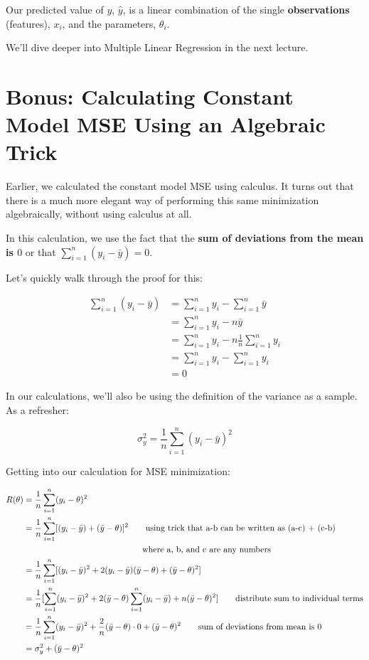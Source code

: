 \documentclass[
  letterpaper,
  DIV=11,
  numbers=noendperiod]{scrreprt}
\begin{document}
Our predicted value of \(y\), \(\hat{y}\), is a linear combination of
the single \textbf{observations} (features), \(x_i\), and the
parameters, \(\theta_i\).

We'll dive deeper into Multiple Linear Regression in the next lecture.

\section{Bonus: Calculating Constant Model MSE Using an Algebraic
Trick}\label{bonus-calculating-constant-model-mse-using-an-algebraic-trick}

Earlier, we calculated the constant model MSE using calculus. It turns
out that there is a much more elegant way of performing this same
minimization algebraically, without using calculus at all.

In this calculation, we use the fact that the \textbf{sum of deviations
from the mean is \(0\)} or that \(\sum_{i=1}^{n} (y_i - \bar{y}) = 0\).

Let's quickly walk through the proof for this:

\begin{align}
\sum_{i=1}^{n} (y_i - \bar{y}) &= \sum_{i=1}^{n} y_i - \sum_{i=1}^{n} \bar{y} \\
 &= \sum_{i=1}^{n} y_i - n\bar{y} \\
 &= \sum_{i=1}^{n} y_i - n\frac{1}{n}\sum_{i=1}^{n}y_i \\
 &= \sum_{i=1}^{n} y_i - \sum_{i=1}^{n}y_i \\
 & = 0
\end{align}

In our calculations, we'll also be using the definition of the variance
as a sample. As a refresher:

\[\sigma_y^2 = \frac{1}{n}\sum_{i=1}^{n} (y_i - \bar{y})^2\]

Getting into our calculation for MSE minimization:

\begin{align}
R(\theta) &= {\frac{1}{n}}\sum^{n}_{i=1} (y_i - \theta)^2
\\ &= \frac{1}{n}\sum^{n}_{i=1} [(y_i - \bar{y}) + (\bar{y} - \theta)]^2\quad \quad \text{using trick that a-b can be written as (a-c) + (c-b) } \\
&\quad \quad \quad \quad \quad \quad \quad \quad \quad \quad \quad \quad \quad \quad \space \space \text{where a, b, and c are any numbers}
\\ &= \frac{1}{n}\sum^{n}_{i=1} [(y_i - \bar{y})^2 + 2(y_i - \bar{y})(\bar{y} - \theta) + (\bar{y} - \theta)^2]
\\ &= \frac{1}{n}[\sum^{n}_{i=1}(y_i - \bar{y})^2 + 2(\bar{y} - \theta)\sum^{n}_{i=1}(y_i - \bar{y}) + n(\bar{y} - \theta)^2] \quad \quad  \text{distribute sum to individual terms}
\\ &= \frac{1}{n}\sum^{n}_{i=1}(y_i - \bar{y})^2 + \frac{2}{n}(\bar{y} - \theta)\cdot0 + (\bar{y} - \theta)^2 \quad \quad  \text{sum of deviations from mean is 0}
\\ &= \sigma_y^2 + (\bar{y} - \theta)^2
\end{align}
\end{document}
